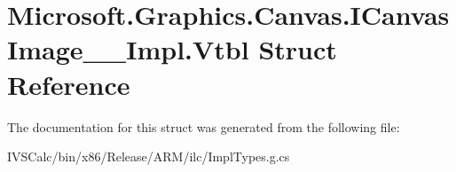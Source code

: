 \hypertarget{struct_microsoft_1_1_graphics_1_1_canvas_1_1_i_canvas_image_____impl_1_1_vtbl}{}\section{Microsoft.\+Graphics.\+Canvas.\+I\+Canvas\+Image\+\_\+\+\_\+\+Impl.\+Vtbl Struct Reference}
\label{struct_microsoft_1_1_graphics_1_1_canvas_1_1_i_canvas_image_____impl_1_1_vtbl}


The documentation for this struct was generated from the following file\+:\begin{DoxyCompactItemize}
\item 
I\+V\+S\+Calc/bin/x86/\+Release/\+A\+R\+M/ilc/Impl\+Types.\+g.\+cs\end{DoxyCompactItemize}

